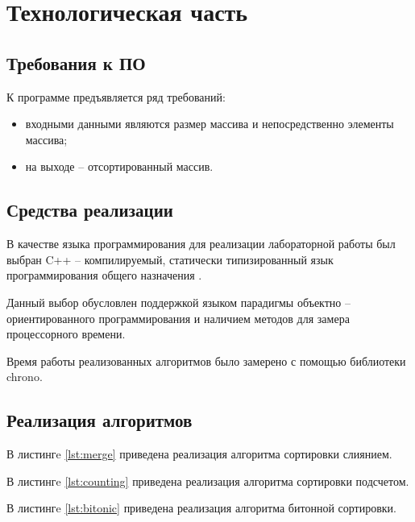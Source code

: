 \chapter{Технологическая часть}

\section{Требования к ПО}

К программе предъявляется ряд требований:
\begin{itemize}
	\item входными данными являются размер массива и непосредственно элементы массива;
	\item на выходе -- отсортированный массив.
\end{itemize}

\section{Средства реализации}

В качестве языка программирования для реализации лабораторной работы был выбран C++ -- компилируемый, статически типизированный язык программирования общего назначения \cite{cpp}. 

Данный выбор обусловлен поддержкой языком парадигмы объектно -- ориентированного программирования и наличием методов для замера процессорного времени.

Время работы реализованных алгоритмов было замерено с помощью библиотеки chrono\cite{chrono}.

\section{Реализация алгоритмов}

В листингe \ref{lst:merge} приведена реализация алгоритма сортировки слиянием.


В листингe \ref{lst:counting} приведена реализация алгоритма сортировки подсчетом.


В листингe \ref{lst:bitonic} приведена реализация алгоритма битонной сортировки.


